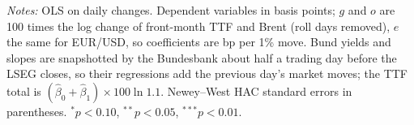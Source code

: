 \documentclass[11pt,a4paper]{article}
\begin{document}
\begin{table}[htbp]
\begin{tabular}{@{}l*{4}{c}@{}}
\bottomrule
\end{tabular}
\par\vspace{4pt}\begin{minipage}{0.94\textwidth}\scriptsize\textit{Notes:} OLS on daily changes. Dependent variables in basis points; $g$ and $o$ are 100 times the log change of front-month TTF and Brent (roll days removed), $e$ the same for EUR/USD, so coefficients are bp per 1\% move. Bund yields and slopes are snapshotted by the Bundesbank about half a trading day before the LSEG closes, so their regressions add the previous day's market moves; the TTF total is $(\hat\beta_0+\hat\beta_1)\times 100\ln 1.1$. Newey--West HAC standard errors in parentheses. $^{*}p<0.10$, $^{**}p<0.05$, $^{***}p<0.01$.\end{minipage}
\end{table}
\end{document}
